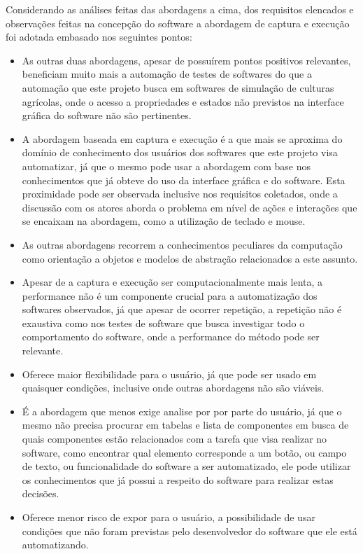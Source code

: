 \documentclass[tg]{mdtufsm}
\begin{document}
                Considerando as análises feitas das abordagens a cima, dos requisitos elencados e observações feitas na concepção do software a abordagem de captura e execução foi adotada embasado nos seguintes pontos:

                \begin{itemize}
                    \item As outras duas abordagens, apesar de possuírem pontos positivos relevantes, beneficiam muito mais a automação de testes de softwares do que a automação que este projeto busca em softwares de simulação de culturas agrícolas, onde o acesso a propriedades e estados não previstos na interface gráfica do software não são pertinentes.

                    \item A abordagem baseada em captura e execução é a que mais se aproxima do domínio de conhecimento dos usuários dos softwares que este projeto visa automatizar, já que o mesmo pode usar a abordagem com base nos conhecimentos que já obteve do uso da interface gráfica e do software. Esta proximidade pode ser observada inclusive nos requisitos coletados, onde a discussão com os atores aborda o problema em nível de ações e interações que se encaixam na abordagem, como a utilização de teclado e mouse.

                    \item As outras abordagens recorrem a conhecimentos peculiares da computação como orientação a objetos e modelos de abstração relacionados a este assunto.

                    \item Apesar de a captura e execução ser computacionalmente mais lenta, a performance não é um componente crucial para a automatização dos softwares observados, já que apesar de ocorrer repetição, a repetição não é exaustiva como nos testes de software que busca investigar todo o comportamento do software, onde a performance do método pode ser relevante.

                    \item Oferece maior flexibilidade para o usuário, já que pode ser usado em quaisquer condições, inclusive onde outras abordagens não são viáveis.

                    \item É a abordagem que menos exige analise por por parte do usuário, já que o mesmo não precisa procurar em tabelas e lista de componentes em busca de quais componentes estão relacionados com a tarefa que visa realizar no software, como encontrar qual elemento corresponde a um botão, ou campo de texto, ou funcionalidade do software a ser automatizado, ele pode utilizar os conhecimentos que já possui a respeito do software para realizar estas decisões.

                    \item Oferece menor risco de expor para o usuário, a possibilidade de usar condições que não foram previstas pelo desenvolvedor do software que ele está automatizando.
                \end{itemize}
\end{document}
